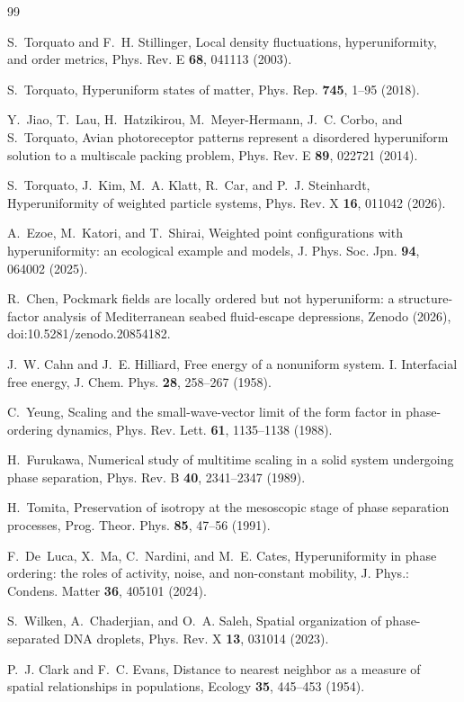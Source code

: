 \documentclass[aps,pre,twocolumn,superscriptaddress,floatfix,longbibliography]{revtex4-2}
\begin{document}
\begin{thebibliography}{99}

S.~Torquato and F.~H. Stillinger,
Local density fluctuations, hyperuniformity, and order metrics,
Phys. Rev. E \textbf{68}, 041113 (2003).

S.~Torquato,
Hyperuniform states of matter,
Phys. Rep. \textbf{745}, 1--95 (2018).

Y.~Jiao, T.~Lau, H.~Hatzikirou, M.~Meyer-Hermann, J.~C. Corbo, and S.~Torquato,
Avian photoreceptor patterns represent a disordered hyperuniform solution to a
multiscale packing problem,
Phys. Rev. E \textbf{89}, 022721 (2014).

S.~Torquato, J.~Kim, M.~A. Klatt, R.~Car, and P.~J. Steinhardt,
Hyperuniformity of weighted particle systems,
Phys. Rev. X \textbf{16}, 011042 (2026).

A.~Ezoe, M.~Katori, and T.~Shirai,
Weighted point configurations with hyperuniformity: an ecological example and
models,
J. Phys. Soc. Jpn. \textbf{94}, 064002 (2025).

R.~Chen,
Pockmark fields are locally ordered but not hyperuniform: a structure-factor
analysis of Mediterranean seabed fluid-escape depressions,
Zenodo (2026), doi:10.5281/zenodo.20854182.

J.~W. Cahn and J.~E. Hilliard,
Free energy of a nonuniform system. I. Interfacial free energy,
J. Chem. Phys. \textbf{28}, 258--267 (1958).

C.~Yeung,
Scaling and the small-wave-vector limit of the form factor in phase-ordering
dynamics,
Phys. Rev. Lett. \textbf{61}, 1135--1138 (1988).

H.~Furukawa,
Numerical study of multitime scaling in a solid system undergoing phase
separation,
Phys. Rev. B \textbf{40}, 2341--2347 (1989).

H.~Tomita,
Preservation of isotropy at the mesoscopic stage of phase separation processes,
Prog. Theor. Phys. \textbf{85}, 47--56 (1991).

F.~De~Luca, X.~Ma, C.~Nardini, and M.~E. Cates,
Hyperuniformity in phase ordering: the roles of activity, noise, and
non-constant mobility,
J. Phys.: Condens. Matter \textbf{36}, 405101 (2024).

S.~Wilken, A.~Chaderjian, and O.~A. Saleh,
Spatial organization of phase-separated DNA droplets,
Phys. Rev. X \textbf{13}, 031014 (2023).

P.~J. Clark and F.~C. Evans,
Distance to nearest neighbor as a measure of spatial relationships in
populations,
Ecology \textbf{35}, 445--453 (1954).

\end{thebibliography}
\end{document}
